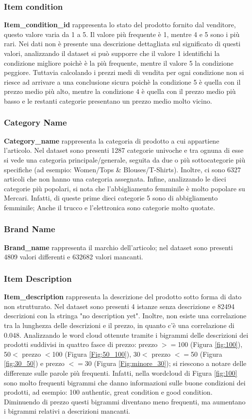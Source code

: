 \subsubsection{Item condition}
\textbf{Item\_condition\_id} rappresenta lo stato del prodotto fornito dal venditore, questo valore varia da 1 a 5.
Il valore più frequente è 1, mentre 4 e 5 sono i più rari. Nei dati non è presente una descrizione dettagliata sul significato di questi valori, analizzando il dataset si può supporre che il valore 1 identifichi la condizione migliore poichè è la più frequente, mentre il valore 5 la condizione peggiore. Tuttavia calcolando i prezzi medi di vendita per ogni condizione non si riesce ad arrivare a una conclusione sicura poichè la condizione 5 è quella con il prezzo medio più alto, mentre la condizione 4 è quella con il prezzo medio più basso e le restanti categorie presentano un prezzo medio molto vicino.
\subsubsection{Category Name}
\textbf{Category\_name} rappresenta la categoria di prodotto a cui appartiene l'articolo.
Nel dataset sono presenti 1287 categorie univoche e tra ognuna di esse si vede una categoria principale/generale, seguita da due o più sottocategorie più specifiche (ad esempio: Women/Tops \& Blouses/T-Shirts). Inoltre, ci sono 6327 articoli che non hanno una categoria assegnata.
Infine, analizzando le dieci categorie più popolari, si nota che l'abbigliamento femminile è molto popolare su Mercari. Infatti, di queste prime dieci categorie 5 sono di abbigliamento femminile; Anche il trucco e l'elettronica sono categorie molto quotate.
\subsubsection{Brand Name}
\textbf{Brand\_name} rappresenta il marchio dell'articolo; nel dataset sono presenti 4809 valori differenti e 632682 valori mancanti.
\subsubsection{Item Description}
\textbf{Item\_description} rappresenta la descrizione del prodotto sotto forma di dato non strutturato. Nel dataset sono presenti 4 istanze senza descrizione e 82494 descrizioni con la stringa "no description yet".
Inoltre, non esiste una correlazione tra la lunghezza delle descrizioni e il prezzo, in quanto c'è una correlazione di 0.048.
Analizzando le word cloud ottenute tramite i bigrammi delle descrizioni  dei prodotti suddivisi in quattro fasce di prezzo: prezzo $>=$100 (Figura \ref{fig:100}), 50$<$ prezzo $<$100 (Figura \ref{Fig:50_100}), 30$<$ prezzo $<=$50 (Figura \ref{fig:30_50}) e prezzo $<=30$ (Figura \ref{Fig:minore_30}); si riescono a notare delle differenze sulle parole più frequenti. Infatti, nella wordcloud di Figura \ref{fig:100} sono molto frequenti bigrammi che danno informazioni sulle buone condizioni dei prodotti, ad esempio:  100 authentic, great condition e good condition.
Diminuendo di prezzo questi bigrammi diventano meno frequenti, ma aumentano i bigrammi relativi a descrizioni mancanti.

